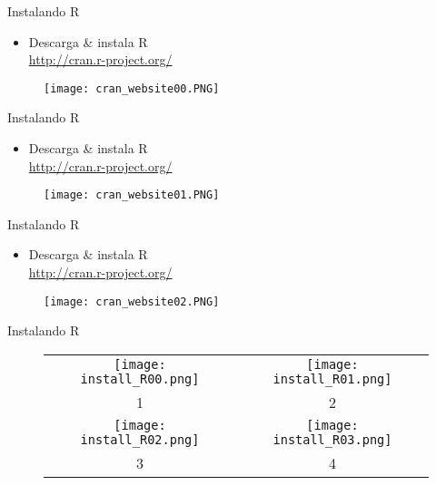 \documentclass{beamer}
\begin{document}
\begin{frame}{Instalando R}
\begin{itemize}
\item Descarga \& instala R\\
\url{http://cran.r-project.org/}
\end{itemize}
\begin{figure}[H]
\centering
\texttt{[image: cran\_website00.PNG]}
\end{figure}
\end{frame}

\begin{frame}{Instalando R}
\begin{itemize}
\item Descarga \& instala R\\
\url{http://cran.r-project.org/}
\end{itemize}
\begin{figure}[H]
\centering
\texttt{[image: cran\_website01.PNG]}
\end{figure}
\end{frame}

\begin{frame}{Instalando R}
\begin{itemize}
\item Descarga \& instala R\\
\url{http://cran.r-project.org/}
\end{itemize}
\begin{figure}[H]
\centering
\texttt{[image: cran\_website02.PNG]}
\end{figure}
\end{frame}

\begin{frame}{Instalando R}

\begin{figure}
\begin{tabular}{cc}
\texttt{[image: install\_R00.png]} &   \texttt{[image: install\_R01.png]} \\
1 & 2\\
\texttt{[image: install\_R02.png]} &  \texttt{[image: install\_R03.png]} \\
3 & 4\\
\end{tabular}
\end{figure}
\end{frame}
\end{document}

